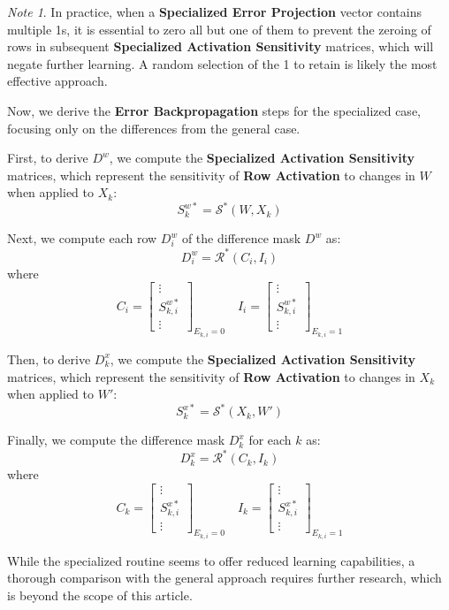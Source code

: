 \documentclass{article}
\theoremstyle{definition}
\theoremstyle{remark}
\newtheorem*{note}{Note}
\begin{document}
\begin{note}
    In practice, when a \textbf{Specialized Error Projection} vector contains multiple 1s, it is essential to zero all but one of them to prevent the zeroing of rows in subsequent \textbf{Specialized Activation Sensitivity} matrices, which will negate further learning. A random selection of the 1 to retain is likely the most effective approach.
\end{note}

Now, we derive the \textbf{Error Backpropagation} steps for the specialized case, focusing only on the differences from the general case.

First, to derive \( D^w \), we compute the \textbf{Specialized Activation Sensitivity} matrices, which represent the sensitivity of \textbf{Row Activation} to changes in \( W \) when applied to \( X_k \):
\[ S^{w*}_k = \mathcal{S}^*(W, X_k) \]

Next, we compute each row \( D^w_i \) of the difference mask \( D^w \) as:
\[ D^w_i = \mathcal{R}^*(C_i, I_i) \]
where
\[ C_i = \begin{bmatrix} \vdots \\ S^{w*}_{k,i} \\ \vdots \end{bmatrix}_{E_{k,i} = 0} \quad I_i = \begin{bmatrix} \vdots \\ S^{w*}_{k,i} \\ \vdots \end{bmatrix}_{E_{k,i} = 1} \]

Then, to derive \( D^x_k \), we compute the \textbf{Specialized Activation Sensitivity} matrices, which represent the sensitivity of \textbf{Row Activation} to changes in \( X_k \) when applied to \( W' \):
\[ S^{x*}_k = \mathcal{S}^*(X_k, W') \]

Finally, we compute the difference mask \( D^x_k \) for each \( k \) as:
\[ D^x_k = \mathcal{R}^*(C_k, I_k) \]
where
\[ C_k = \begin{bmatrix} \vdots \\ S^{x*}_{k,i} \\ \vdots \end{bmatrix}_{E_{k,i} = 0} \quad I_k = \begin{bmatrix} \vdots \\ S^{x*}_{k,i} \\ \vdots \end{bmatrix}_{E_{k,i} = 1} \]

While the specialized routine seems to offer reduced learning capabilities, a thorough comparison with the general approach requires further research, which is beyond the scope of this article.
\end{document}
